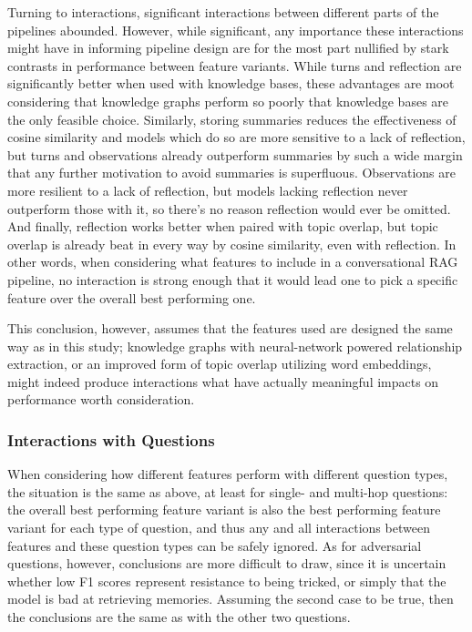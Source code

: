 Turning to interactions, significant interactions between different parts of the pipelines abounded. However, while significant, any importance these interactions might have in informing pipeline design are for the most part nullified by stark contrasts in performance between feature variants. While turns and reflection are significantly better when used with knowledge bases, these advantages are moot considering that knowledge graphs perform so poorly that knowledge bases are the only feasible choice. Similarly, storing summaries reduces the effectiveness of cosine similarity and models which do so are more sensitive to a lack of reflection, but turns and observations already outperform summaries by such a wide margin that any further motivation to avoid summaries is superfluous. Observations are more resilient to a lack of reflection, but models lacking reflection never outperform those with it, so there's no reason reflection would ever be omitted. And finally, reflection works better when paired with topic overlap, but topic overlap is already beat in every way by cosine similarity, even with reflection. In other words, when considering what features to include in a conversational RAG pipeline, no interaction is strong enough that it would lead one to pick a specific feature over the overall best performing one.

This conclusion, however, assumes that the features used are designed the same way as in this study; knowledge graphs with neural-network powered relationship extraction, or an improved form of topic overlap utilizing word embeddings, might indeed produce interactions what have actually meaningful impacts on performance worth consideration.


\subsubsection{Interactions with Questions}

When considering how different features perform with different question types, the situation is the same as above, at least for single- and multi-hop questions: the overall best performing feature variant is also the best performing feature variant for each type of question, and thus any and all interactions between features and these question types can be safely ignored. As for adversarial questions, however, conclusions are more difficult to draw, since it is uncertain whether low F1 scores represent resistance to being tricked, or simply that the model is bad at retrieving memories. Assuming the second case to be true, then the conclusions are the same as with the other two questions.


